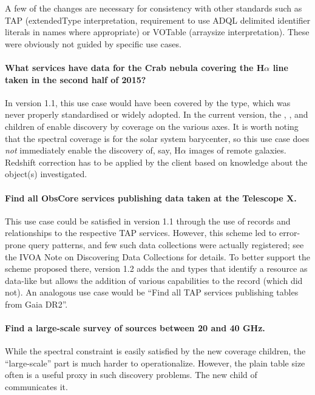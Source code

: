 \documentclass[11pt,a4paper]{ivoa}
\begin{document}
A few of the changes are necessary for consistency with other standards
such as TAP (extendedType interpretation, requirement to use ADQL
delimited identifier literals in names where appropriate) or VOTable
(arraysize interpretation).  These were obviously not guided by specific
use cases.


\paragraph{What services have data for the Crab nebula covering the H$\alpha$ 
line taken in the second half of 2015?}  In version 1.1, this use case
would have been covered by the  type,
which was never properly standardised or widely adopted.  In the current
version, the , , and 
children of  enable discovery by coverage on the various
axes.  It is worth noting that the spectral coverage is for the solar
system barycenter, so this use case does \emph{not} immediately enable
the discovery of, say, H$\alpha$ images of remote galaxies.  Redshift
correction has to be applied by the client based on knowledge about the
object(s) investigated.

\paragraph{Find all ObsCore services publishing data taken at the
Telescope X.} This use case could be satisfied in version 1.1 through
the use of  records and relationships to the
respective TAP services.  However, this scheme led to error-prone query
patterns, and few such data collections were actually registered; see
the IVOA Note on Discovering Data Collections \citep{note:DataCollect} for
details.  To better support the scheme proposed there, version 1.2 adds
the  and  types 
that identify a resource as data-like but
allows the addition of various capabilities to the record (which
 did not).  An analogous use case would be
``Find all TAP services publishing tables from Gaia DR2''.

\paragraph{Find a large-scale survey of sources between 20 and 40 GHz.}
While the spectral constraint is easily satisfied by the new coverage
children, the ``large-scale'' part is much harder to operationalize.
However, the plain table size often is a useful proxy in such discovery
problems.  The new  child of  communicates
it.
\end{document}
